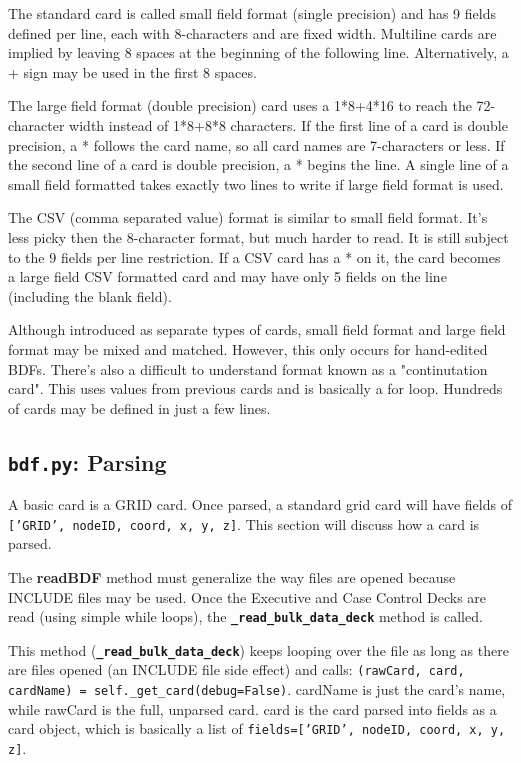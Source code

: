      The standard card is called small field format (single precision) and has 9 fields defined per line, each with 8-characters and are fixed width.  Multiline cards are implied by leaving 8 spaces at the beginning of the following line.  Alternatively, a + sign may be used in the first 8 spaces.
     
     The large field format (double precision) card uses a 1*8+4*16 to reach the 72-character width instead of 1*8+8*8 characters.  If the first line of a card is double precision, a * follows the card name, so all card names are 7-characters or less.  If the second line of a card is double precision, a * begins the line.  A single line of a small field formatted takes exactly two lines to write if large field format is used.
     
     The CSV (comma separated value) format is similar to small field format.  It's less picky then the 8-character format, but much harder to read.  It is still subject to the 9 fields per line restriction.  If a CSV card has a * on it, the card becomes a large field CSV formatted card and may have only 5 fields on the line (including the blank field).
     
     Although introduced as separate types of cards, small field format and large field format may be mixed and matched.  However, this only occurs for hand-edited BDFs.  There's also a difficult to understand format known as a "continutation card".  This uses values from previous cards and is basically a for loop.  Hundreds of cards may be defined in just a few lines.
     
 \subsection{{\tt bdf.py}: Parsing}
     A basic card is a GRID card.  Once parsed, a standard grid card will have fields of {\tt ['GRID', nodeID, coord, x, y, z]}.  This section will discuss how a card is parsed.  
     
     The {\bf readBDF} method must generalize the way files are opened because INCLUDE files may be used.  Once the Executive and Case Control Decks are read (using simple while loops), the {\bf \tt \_read\_bulk\_data\_deck} method is called.
     
     This method ({\bf \tt \_read\_bulk\_data\_deck}) keeps looping over the file as long as there are files opened (an INCLUDE file side effect) and calls:
     {\tt (rawCard, card, cardName) = self.\_get\_card(debug=False)}.  cardName is just the card's name, while rawCard is the full, unparsed card.  card is the card parsed into fields as a card object, which is basically a list of {\tt fields=['GRID', nodeID, coord, x, y, z]}.

